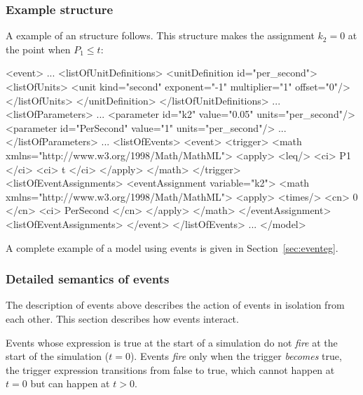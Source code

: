\subsubsection{Example  structure}

A example of an \Event structure follows.  This structure makes the
assignment $k_2 = 0$ at the point when $P_1 \leq t$:

\begin{example}
<event>
    ...
    <listOfUnitDefinitions>
        <unitDefinition id="per_second">
            <listOfUnits>
                <unit kind="second" exponent="-1" multiplier="1" offset="0"/>
            </listOfUnits>
        </unitDefinition>
    </listOfUnitDefinitions>
    ...
    <listOfParameters>
        ...
        <parameter id="k2" value="0.05" units="per_second"/>
        <parameter id="PerSecond" value="1" units="per_second"/>
        ...
    </listOfParameters>
    ...
    <listOfEvents>
        <event>
            <trigger>
                <math xmlns="http://www.w3.org/1998/Math/MathML">
                    <apply>
                        <leq/>
                        <ci> P1 </ci>
                        <ci> t </ci>
                    </apply>
                </math>
            </trigger>
            <listOfEventAssignments>
                <eventAssignment variable="k2">
                    <math xmlns="http://www.w3.org/1998/Math/MathML">
                        <apply>
                            <times/>
                            <cn> 0 </cn>
                            <ci> PerSecond </cn>
                        </apply>
                    </math>
                </eventAssignment>
            <listOfEventAssignments>
        </event>
    </listOfEvents>
    ...
</model>
\end{example}

A complete example of a model using events is given in
Section~\ref{sec:eventeg}.


\subsubsection{Detailed semantics of events}
\label{sec:events-semantics}

The description of events above describes the action of events in
isolation from each other.  This section describes how events
interact.

Events whose  expression is true at the start of a
simulation do not \emph{fire} at the start of the simulation ($t =
0$).  Events \emph{fire} only when the trigger \emph{becomes}
true, \ie the trigger expression transitions from false to true,
which cannot happen at $t = 0$ but can happen at $t > 0$.

